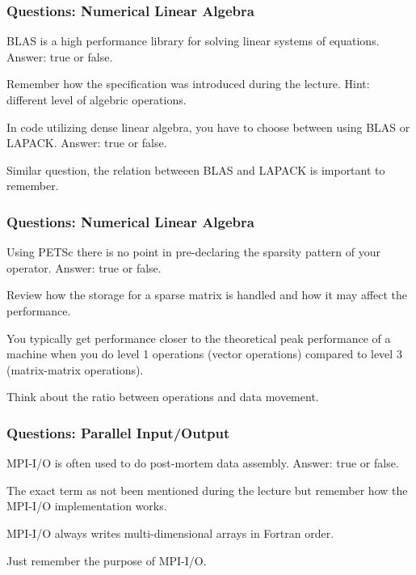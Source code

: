 \begin{frame}[fragile]
  \frametitle{Questions: Numerical Linear Algebra}


\begin{ex}[2016]
BLAS is a high performance library for solving linear systems of equations.
Answer: true or false.
\end{ex}

Remember how the specification was introduced during the lecture.
Hint: different level of algebric operations.

\begin{ex}[2015]
In code utilizing dense linear algebra, you have to choose between using
BLAS or LAPACK. Answer: true or false.
\end{ex}

Similar question, the relation betweeen BLAS and LAPACK is important to remember.

\end{frame}

\begin{frame}[fragile]
  \frametitle{Questions: Numerical Linear Algebra}

\begin{ex}[2015]
Using PETSc there is no point in pre-declaring the sparsity pattern of your
operator. Answer: true or false.
\end{ex}

Review how the storage for a sparse matrix is handled and how it may affect the performance.

\begin{ex}[2014]
You typically get performance closer to the theoretical peak performance of
a machine when you do level 1 operations (vector operations) compared to
level 3 (matrix-matrix operations).
\end{ex}

Think about the ratio between operations and data movement.

\end{frame}

\begin{frame}[fragile]
  \frametitle{Questions: Parallel Input/Output}

\begin{ex}[2015]
MPI-I/O is often used to do post-mortem data assembly.
Answer: true or false.
\end{ex}

The exact term as not been mentioned during the lecture but remember how the MPI-I/O implementation works.

\begin{ex}[2014]
MPI-I/O always writes multi-dimensional arrays in Fortran order.
\end{ex}

Just remember the purpose of MPI-I/O.

\end{frame}



